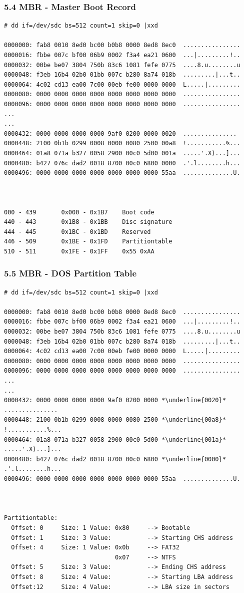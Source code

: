 \begin{frame}[fragile]
  \frametitle{5.4 MBR - Master Boot Record}
  \begin{lstlisting}[basicstyle=\tiny]
# dd if=/dev/sdc bs=512 count=1 skip=0 |xxd

0000000: fab8 0010 8ed0 bc00 b0b8 0000 8ed8 8ec0  ................
0000016: fbbe 007c bf00 06b9 0002 f3a4 ea21 0600  ...|.........!..
0000032: 00be be07 3804 750b 83c6 1081 fefe 0775  ....8.u........u
0000048: f3eb 16b4 02b0 01bb 007c b280 8a74 018b  .........|...t..
0000064: 4c02 cd13 ea00 7c00 00eb fe00 0000 0000  L.....|.........
0000080: 0000 0000 0000 0000 0000 0000 0000 0000  ................
0000096: 0000 0000 0000 0000 0000 0000 0000 0000  ................
...
...
0000432: 0000 0000 0000 0000 9af0 0200 0000 0020  ............... 
0000448: 2100 0b1b 0299 0008 0000 0080 2500 00a8  !...........%...
0000464: 01a8 071a b327 0058 2900 00c0 5d00 001a  .....'.X)...]...
0000480: b427 076c dad2 0018 8700 00c0 6800 0000  .'.l........h...
0000496: 0000 0000 0000 0000 0000 0000 0000 55aa  ..............U.



000 - 439       0x000 - 0x1B7    Boot code
440 - 443       0x1B8 - 0x1BB    Disc signature
444 - 445       0x1BC - 0x1BD    Reserved
446 - 509       0x1BE - 0x1FD    Partitiontable
510 - 511       0x1FE - 0x1FF    0x55 0xAA
  \end{lstlisting}
\end{frame}


\begin{frame}[fragile]
  \frametitle{5.5 MBR - DOS Partition Table}
  \begin{lstlisting}[basicstyle=\tiny,escapechar=\*]
# dd if=/dev/sdc bs=512 count=1 skip=0 |xxd

0000000: fab8 0010 8ed0 bc00 b0b8 0000 8ed8 8ec0  ................
0000016: fbbe 007c bf00 06b9 0002 f3a4 ea21 0600  ...|.........!..
0000032: 00be be07 3804 750b 83c6 1081 fefe 0775  ....8.u........u
0000048: f3eb 16b4 02b0 01bb 007c b280 8a74 018b  .........|...t..
0000064: 4c02 cd13 ea00 7c00 00eb fe00 0000 0000  L.....|.........
0000080: 0000 0000 0000 0000 0000 0000 0000 0000  ................
0000096: 0000 0000 0000 0000 0000 0000 0000 0000  ................
...
...
0000432: 0000 0000 0000 0000 9af0 0200 0000 *\underline{0020}*  ............... 
0000448: 2100 0b1b 0299 0008 0000 0080 2500 *\underline{00a8}*  !...........%...
0000464: 01a8 071a b327 0058 2900 00c0 5d00 *\underline{001a}*  .....'.X)...]...
0000480: b427 076c dad2 0018 8700 00c0 6800 *\underline{0000}*  .'.l........h...
0000496: 0000 0000 0000 0000 0000 0000 0000 55aa  ..............U.



Partitiontable:
  Offset: 0     Size: 1	Value: 0x80     --> Bootable
  Offset: 1     Size: 3	Value:          --> Starting CHS address
  Offset: 4     Size: 1	Value: 0x0b     --> FAT32
                               0x07     --> NTFS
  Offset: 5     Size: 3	Value:          --> Ending CHS address
  Offset: 8     Size: 4 Value:          --> Starting LBA address
  Offset:12     Size: 4 Value:          --> LBA size in sectors

  \end{lstlisting}
\end{frame}


